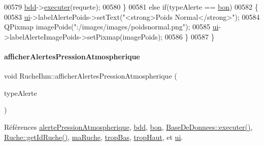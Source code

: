 \begin{DoxyCode}
00579         \hyperlink{class_ruche_ihm_a0851936fe212e8d40538264f09749153}{bdd}->\hyperlink{class_base_de_donnees_aa8de5f8f8bb17edc43f5c0ee33712081}{executer}(requete);
00580     \}
00581     \textcolor{keywordflow}{else} \textcolor{keywordflow}{if}(typeAlerte == \hyperlink{parametres_8h_aaa6de8207c94675264c90b10b613368da5ac8ec3b54d90a07c6bb5a77ef971821}{bon})
00582     \{
00583         \hyperlink{class_ruche_ihm_a64786058bd7f88ca2f1e9743bb27c25b}{ui}->labelAlertePoids->setText(\textcolor{stringliteral}{"<strong>Poids Normal</strong>"});
00584         QPixmap imagePoids(\textcolor{stringliteral}{":/images/images/poidsnormal.png"});
00585         \hyperlink{class_ruche_ihm_a64786058bd7f88ca2f1e9743bb27c25b}{ui}->labelAlerteImagePoids->setPixmap(imagePoids);
00586     \}
00587 \}
\end{DoxyCode}
\mbox{\label{class_ruche_ihm_abea08b19d4f52f6767a8618bbc25d956}} 
\paragraph{\texorpdfstring{afficher\+Alertes\+Pression\+Atmospherique}{afficherAlertesPressionAtmospherique}}
{\footnotesize\ttfamily void Ruche\+Ihm\+::afficher\+Alertes\+Pression\+Atmospherique (\begin{DoxyParamCaption}\item[{\hyperlink{parametres_8h_aaa6de8207c94675264c90b10b613368d}{Seuils\+Alertes}}]{type\+Alerte }\end{DoxyParamCaption})\hspace{0.3cm}{\ttfamily [slot]}}



Références \hyperlink{parametres_8h_a83a725fd153179a2bd97afcc8307737ba3b3b9fe16ae965531aca47449d865ce1}{alerte\+Pression\+Atmospherique}, \hyperlink{class_ruche_ihm_a0851936fe212e8d40538264f09749153}{bdd}, \hyperlink{parametres_8h_aaa6de8207c94675264c90b10b613368da5ac8ec3b54d90a07c6bb5a77ef971821}{bon}, \hyperlink{class_base_de_donnees_aa8de5f8f8bb17edc43f5c0ee33712081}{Base\+De\+Donnees\+::executer()}, \hyperlink{class_ruche_a9f2de5ef29557ec7a53d5e22df34d164}{Ruche\+::get\+Id\+Ruche()}, \hyperlink{class_ruche_ihm_a43a6b1fa31f4fba58d919daae3707b38}{ma\+Ruche}, \hyperlink{parametres_8h_aaa6de8207c94675264c90b10b613368da4257e2f8921856770c8266f55c937295}{trop\+Bas}, \hyperlink{parametres_8h_aaa6de8207c94675264c90b10b613368dabc650d9700ae19f2696e6a6e3f9ab067}{trop\+Haut}, et \hyperlink{class_ruche_ihm_a64786058bd7f88ca2f1e9743bb27c25b}{ui}.



